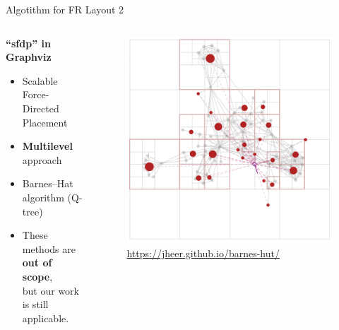 \documentclass[13pt,aspectratio=169,table,dvipdfmx]{beamer}
\begin{document}
    \begin{frame}{Algotithm for FR Layout 2}
        \begin{columns}
            \begin{column}{0.4\columnwidth}
                \textbf{``sfdp'' in Graphviz}
                \begin{itemize}
                    \item Scalable Force-Directed Placement
                    \item \textbf{Multilevel} approach
                    \item Barnes--Hat algorithm (Q-tree)\cite{Hu2006EfficientHF}
                          \cite{barnesHierarchicalLogForcecalculation1986}
                    \item These methods are\\\textbf{out of scope},\\
                          but our work is still applicable.
                \end{itemize}
            \end{column}
            \begin{column}{0.6\columnwidth}
                \begin{figure}[htbp]
                    \centering
                    \includegraphics[width=0.7\columnwidth]{imgs/BH.png}
                    \caption{\footnotesize{\url{https://jheer.github.io/barnes-hut/}}}
                \end{figure}
            \end{column}
        \end{columns}
    \end{frame}
\fi
\end{document}
